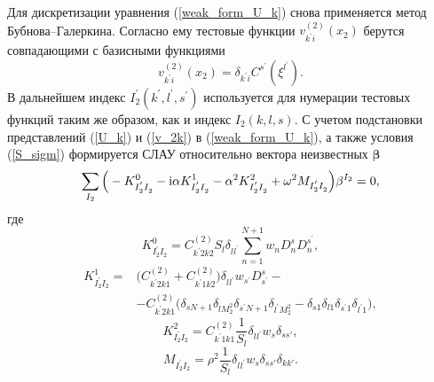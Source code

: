 \documentclass[press]{vestnik}
\begin{document}
Для дискретизации уравнения (\ref{weak_form_U_k}) снова применяется метод Бубнова–Галеркина. Согласно ему тестовые функции $v_{k^{'}i}^{(2)}({x_2})$ берутся совпадающими с базисными функциями
\begin{equation} \label{v_2k}
	v_{k^{'}i}^{(2)}(x_2) = \delta_{k^{'}i} C^{s^{'}}(\xi^{l^{'}}).
\end{equation}
В дальнейшем индекс $I_{2}^{'}(k^{'},l^{'},s^{'})$ используется для нумерации тестовых функций таким же образом, как и индекс $I_{2}(k,l,s)$. 
С учетом подстановки представлений (\ref{U_k}) и (\ref{v_2k}) в (\ref{weak_form_U_k}), а также условия (\ref{S_sigm}) формируется СЛАУ относительно вектора неизвестных $\bm{\beta}$
\begin{equation} \label{Slau_2}
\sum_{I_2} \Big( -K_{I_{2}^{'} I_{2}^{}}^{0} - {\rm{i}} \alpha K_{I_{2}^{'} I_{2}^{}}^{1} - \alpha^{2} K_{I_{2}^{'} I_{2}^{}}^{2} + \omega^{2} M_{I_{2}^{'} I_{2}^{}} \Big) \beta^{I_2} = 0,
\end{equation}
где
$$
K_{I_{2}^{'} I_{2}^{}}^{0} = C_{k^{'}2k2}^{(2)} S_{l} \delta_{l^{} l^{'}} \sum_{n=1}^{N+1} w_{n} D_{n}^{s} D_{n}^{s^{'}},
$$
\begin{equation*}
	\begin{split}
		K_{I_{2}^{'} I_{2}^{}}^{1} =& \Big( C_{k^{'}2k1}^{(2)} + C_{k^{'}1k2}^{(2)} \Big) \delta_{l^{} l^{'}} w_{s^{'}} D_{s^{'}}^{s} - 
		\\
		&-C_{k^{'}2k1}^{(2)} \Big( \delta_{s N+1} \delta_{l M_{2}^{2}} \delta_{s^{'} N+1} \delta_{l^{'} M_{2}^{2}} - \delta_{s 1} \delta_{l 1} \delta_{s^{'} 1} \delta_{l^{'} 1} \Big),
	\end{split}
\end{equation*}
$$
K_{I_{2}^{'} I_{2}^{}}^{2} = C_{k^{'}1k1}^{(2)} \frac{1}{S_{l}}  \delta_{l^{} l^{'}} w_{s} \delta_{s s{'}},
$$
$$
M_{I_{2}^{'} I_{2}^{}} = \rho^{2} \frac{1}{S_{l}}  \delta_{l^{} l^{'}} w_{s} \delta_{s s{'}} \delta_{k k{'}}.
$$
\end{document}
